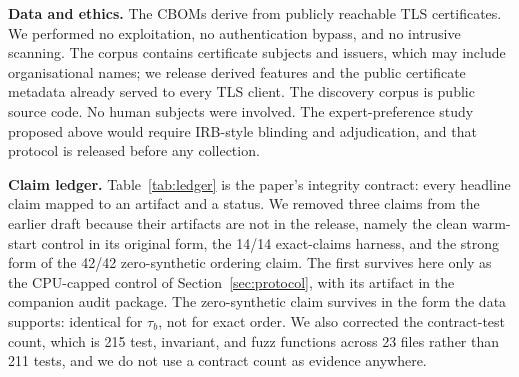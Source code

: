 \documentclass[journal,10pt]{IEEEtran}
\newcommand{\tb}{\tau_b}
\begin{document}
\textbf{Data and ethics.} The CBOMs derive from publicly reachable TLS certificates. We performed no
exploitation, no authentication bypass, and no intrusive scanning. The corpus contains certificate
subjects and issuers, which may include organisational names; we release derived features and the
public certificate metadata already served to every TLS client. The discovery corpus is public
source code. No human subjects were involved. The expert-preference study proposed above would
require IRB-style blinding and adjudication, and that protocol is released before any collection.

\textbf{Claim ledger.} Table~\ref{tab:ledger} is the paper's integrity contract: every headline
claim mapped to an artifact and a status. We removed three claims from the earlier draft because
their artifacts are not in the release, namely the clean warm-start control in its original form,
the 14/14 exact-claims harness, and the strong form of the 42/42 zero-synthetic ordering claim. The
first survives here only as the CPU-capped control of Section~\ref{sec:protocol}, with its artifact
in the companion audit package. The zero-synthetic claim survives in the form the data supports:
identical for $\tb$, not for exact order. We also corrected the contract-test count, which is 215
test, invariant, and fuzz functions across 23 files rather than 211 tests, and we do not use a
contract count as evidence anywhere.
\end{document}
